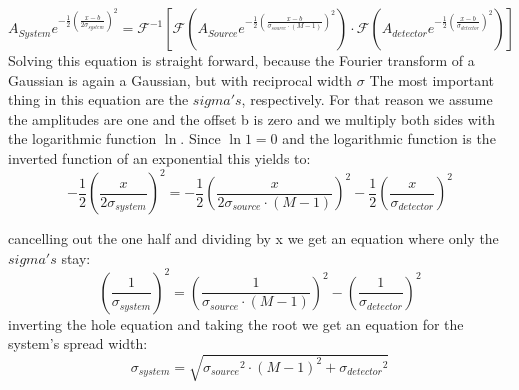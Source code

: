 \begin{equation}
A_{System}e^{-\frac{1}{2}(\frac{x -b}{2\sigma_{system}})^{2}} = \mathcal{F^{-1}}[\mathcal{F}(A_{Source}e^{-\frac{1}{2}(\frac{x -b}{\sigma_{source}\cdot(M-1)})^{2}})
\cdot \mathcal{F}(A_{detector}e^{-\frac{1}{2}(\frac{x -b}{\sigma_{detector}})^{2}})]
\end{equation}
Solving this equation is straight forward, because the Fourier transform of a Gaussian is again a Gaussian, but with reciprocal width $\sigma$
The most important thing in this equation are the $sigma's$, respectively. 
For that reason we assume the amplitudes are one and the offset b is zero and we multiply both sides with the logarithmic function $\ln$.
Since $\ln{1} = 0$ and the logarithmic function is the inverted function of an exponential this yields to:
\begin{equation}
-\frac{1}{2}(\frac{x}{2\sigma_{system}})^{2} = -\frac{1}{2}(\frac{x}{2\sigma_{source}\cdot(M-1)})^{2}-\frac{1}{2}(\frac{x}{\sigma_{detector}})^{2}
\end{equation}

cancelling out the one half and dividing by x we get an equation where only the $sigma's$ stay:
\begin{equation}
(\frac{1}{\sigma_{system}})^{2} = (\frac{1}{\sigma_{source}\cdot(M-1)})^{2}-(\frac{1}{\sigma_{detector}})^{2}
\end{equation}
inverting the hole equation and taking the root we get an equation for the system's spread width:
\begin{equation}
 \sigma_{system} = \sqrt{{\sigma_{source}}^{2}\cdot(M-1)^{2}+{\sigma_{detector}}^{2}}
\end{equation}
 














